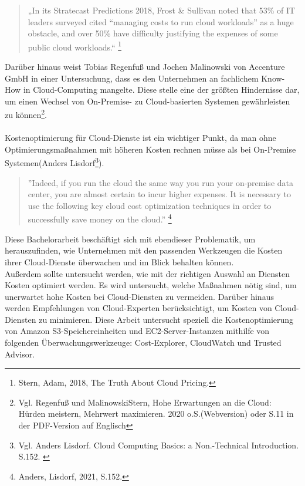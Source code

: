 \begin{quote}
    „In its Stratecast Predictions 2018, Frost \& Sullivan noted that 53\% of IT leaders surveyed cited “managing costs to run cloud workloads” as a huge obstacle, and over 50\% have difficulty justifying the expenses of some public cloud workloads.“  
    \footnote{Stern, Adam, 2018, The Truth About Cloud Pricing.\cite{SP1}}
\end{quote}
Darüber hinaus weist Tobias Regenfuß und Jochen Malinowski
von Accenture GmbH in einer Untersuchung, dass es den Unternehmen an fachlichem Know-How in Cloud-Computing mangelte. Diese stelle eine der größten Hindernisse dar, um einen Wechsel von On-Premise- zu Cloud-basierten Systemen gewährleisten zu können\footnote{Vgl. Regenfuß und MalinowskiStern, Hohe Erwartungen an die Cloud: Hürden meistern, Mehrwert maximieren. 2020 o.S.(Webversion) oder S.11 in der PDF-Version auf Englisch\cite{ACC1}}.
\\\\
Kostenoptimierung für Cloud-Dienste ist ein wichtiger Punkt, da man ohne Optimierungsmaßnahmen mit höheren Kosten rechnen müsse als bei On-Premise Systemen(Anders Lisdorf\footnote{Vgl. Anders Lisdorf. Cloud Computing Basics: a Non.-Technical Introduction. S.152. \cite{CCB}}).
\\
\begin{quote}
    ”Indeed, if you run the cloud the same way you run your on-premise data center, you are almost certain to incur higher expenses. It is necessary to use the following key cloud cost optimization techniques in order to successfully save money on the cloud.”
    \footnote{Anders, Lisdorf, 2021, S.152.\cite{CCB}}
\end{quote}
\begin{flushleft}
Diese Bachelorarbeit beschäftigt sich mit ebendieser Problematik, um herauszufinden, wie Unternehmen mit den passenden Werkzeugen die Kosten ihrer Cloud-Dienste überwachen und im Blick behalten können. %
\\
Außerdem sollte untersucht werden, wie mit der richtigen Auswahl an Diensten Kosten optimiert werden. 
Es wird untersucht, welche Maßnahmen nötig sind, um unerwartet hohe Kosten bei Cloud-Diensten zu vermeiden. Darüber hinaus werden Empfehlungen von Cloud-Experten berücksichtigt, um Kosten von Cloud-Diensten zu minimieren. Diese Arbeit untersucht speziell die Kostenoptimierung  von Amazon S3-Speichereinheiten und EC2-Server-Instanzen mithilfe von folgenden Überwachungswerkzeuge: Cost-Explorer, CloudWatch und Trusted Advisor.
\end{flushleft}


